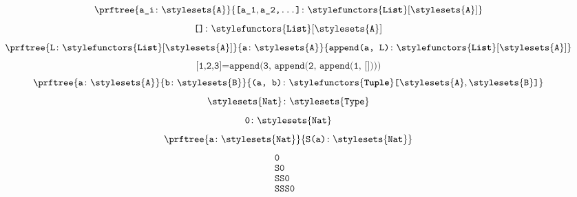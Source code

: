 {\begin{forslides}
\begin{equation}
            \label{eq:typecon_1_session1_22}
            \prftree{\texttt{a\_i}\colon \stylesets{\texttt{A}}}{\texttt{[a\_1},\texttt{a\_2,\ldots]}\colon \stylefunctors{\textbf{\texttt{List}}}[\stylesets{\texttt{A}}]}
        \end{equation}
        \begin{equation}
            \label{eq:typecon_2_session1_22}
            \texttt{[]}\colon \stylefunctors{\textbf{\texttt{List}}}[\stylesets{\texttt{A}}]
        \end{equation}
        \begin{equation}
            \label{eq:typecon_3_session1_22}
            \prftree{\texttt{L}\colon \stylefunctors{\textbf{\texttt{List}}}[\stylesets{\texttt{A}}]}{\texttt{a}\colon \stylesets{\texttt{A}}}{\texttt{append(a, L)}\colon \stylefunctors{\textbf{\texttt{List}}}[\stylesets{\texttt{A}}]}
        \end{equation}
        \begin{equation}
            \label{eq:typecon_4_session1_22}
            \texttt{[1,2,3]} = \texttt{append(3, append(2, append(1, [])))}
        \end{equation}
        \begin{equation}
            \label{eq:typecon_5_session1_22}
            \prftree{\texttt{a}\colon \stylesets{\texttt{A}}}
            {\texttt{b}\colon \stylesets{\texttt{B}}}
            {\texttt{(a, b)}\colon \stylefunctors{\textbf{\texttt{Tuple}}}\texttt{[}\stylesets{\texttt{A}},\stylesets{\texttt{B}}\texttt{]}}
        \end{equation}
        \begin{equation}
            \label{eq:typecon_6_session1_22}
            \stylesets{\texttt{Nat}}\colon \stylesets{\texttt{Type}}
        \end{equation}
        \begin{equation}
            \label{eq:typecon_7_session1_22}
            \texttt{0}\colon \stylesets{\texttt{Nat}}
        \end{equation}
        \begin{equation}
            \label{eq:typecon_8_session1_22}
            \prftree{\texttt{a}\colon \stylesets{\texttt{Nat}}}
            {\texttt{S(a)}\colon \stylesets{\texttt{Nat}}}
        \end{equation}
        \begin{equation}
            \label{eq:typecon_9_session1_22}
            \begin{aligned}
                \texttt{0}    & \\
                \texttt{S0}   & \\
                \texttt{SS0}  & \\
                \texttt{SSS0} &
            \end{aligned}
        \end{equation}
    \end{forslides}
}
